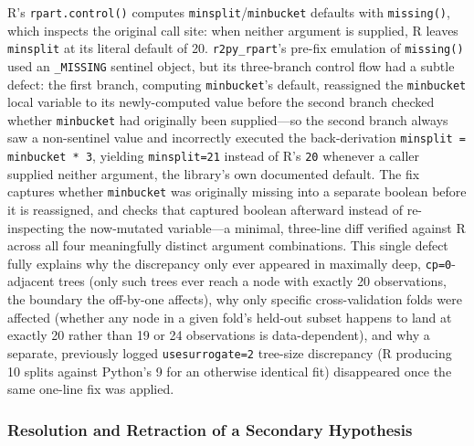 \documentclass[12pt]{article}
\begin{document}
R's \texttt{rpart.control()} computes \texttt{minsplit}/\texttt{minbucket} defaults with \texttt{missing()}, which inspects the original call site: when neither argument is supplied, R leaves \texttt{minsplit} at its literal default of 20. \texttt{r2py\_rpart}'s pre-fix emulation of \texttt{missing()} used an \texttt{\_MISSING} sentinel object, but its three-branch control flow had a subtle defect: the first branch, computing \texttt{minbucket}'s default, reassigned the \texttt{minbucket} local variable to its newly-computed value before the second branch checked whether \texttt{minbucket} had originally been supplied---so the second branch always saw a non-sentinel value and incorrectly executed the back-derivation \texttt{minsplit = minbucket * 3}, yielding \texttt{minsplit=21} instead of R's \texttt{20} whenever a caller supplied neither argument, the library's own documented default. The fix captures whether \texttt{minbucket} was originally missing into a separate boolean before it is reassigned, and checks that captured boolean afterward instead of re-inspecting the now-mutated variable---a minimal, three-line diff verified against R across all four meaningfully distinct argument combinations. This single defect fully explains why the discrepancy only ever appeared in maximally deep, \texttt{cp=0}-adjacent trees (only such trees ever reach a node with exactly 20 observations, the boundary the off-by-one affects), why only specific cross-validation folds were affected (whether any node in a given fold's held-out subset happens to land at exactly 20 rather than 19 or 24 observations is data-dependent), and why a separate, previously logged \texttt{usesurrogate=2} tree-size discrepancy (R producing 10 splits against Python's 9 for an otherwise identical fit) disappeared once the same one-line fix was applied.

\subsubsection{Resolution and Retraction of a Secondary Hypothesis}
\end{document}

